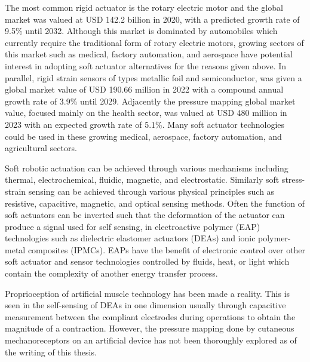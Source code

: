The most common rigid actuator is the rotary electric motor and the global market was valued at USD 142.2 billion in 2020, with a predicted growth rate of 9.5\% until 2032\cite{alliedmarketresearch}. Although this market is dominated by automobiles which currently require the traditional form of rotary electric motors, growing sectors of this market such as medical, factory automation, and aerospace have potential interest in adopting soft actuator alternatives for the reasons given above. In parallel, rigid strain sensors of types metallic foil and semiconductor, was given a global market value of USD 190.66 million in 2022 with a compound annual growth rate of 3.9\% until 2029\cite{maximizemarketresearch}. Adjacently the pressure mapping global market value, focused mainly on the health sector, was valued at USD 480 million in 2023 with an expected growth rate of 5.1\%\cite{usdanalytics,visualizeresearch}. Many soft actuator technologies could be used in these growing medical, aerospace, factory automation, and agricultural sectors.


Soft robotic actuation can be achieved through various mechanisms including thermal, electrochemical, fluidic, magnetic, and electrostatic. Similarly soft stress-strain sensing can be achieved through various physical principles such as resistive, capacitive, magnetic, and optical sensing methods. Often the function of soft actuators can be inverted such that the deformation of the actuator can produce a signal used for self sensing, in electroactive polymer (EAP) technologies such as dielectric elastomer actuators (DEAs)\cite{Gisby2013, Rosset2013, Liu2016, Huang2023} and ionic polymer-metal composites (IPMCs)\cite{MohdIsa2019}. EAPs have the benefit of electronic control over other soft actuator and sensor technologies controlled by fluids, heat, or light which contain the complexity of another energy transfer process.

Proprioception of artificial muscle technology has been made a reality. This is seen in the self-sensing of DEAs in one dimension usually through capacitive measurement between the compliant electrodes during operations to obtain the magnitude of a contraction. However, the pressure mapping done by cutaneous mechanoreceptors on an artificial device has not been thoroughly explored as of the writing of this thesis. 

